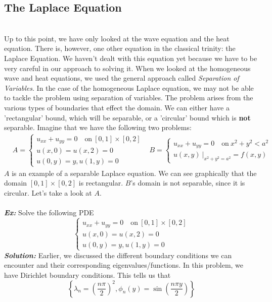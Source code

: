 \subsection{The Laplace Equation}
\noindent \\
\indent Up to this point, we have only looked at the wave equation and the heat equation. There is, however, one other equation in the classical trinity: the Laplace Equation. We haven't dealt with this equation yet because we have to be very careful in our approach to solving it. When we looked at the homogeneous wave and heat equations, we used the general approach called \textit{Separation of Variables}. In the case of the homogeneous Laplace equation, we may not be able to tackle the problem using separation of variables. The problem arises from the various types of boundaries that effect the domain. We can either have a 'rectangular' bound, which will be separable, or a 'circular' bound which is \textbf{not} separable. Imagine that we have the following two problems:
\begin{align*}
&A =\begin{cases}
u_{xx} + u_{yy} = 0\quad \text{on}\ [0,1]\times[0,2]\\
u(x,0) = u(x,2) = 0\\
u(0,y) = y, u(1,y) = 0
\end{cases}
&B =\begin{cases}
u_{xx} + u_{yy} = 0\quad \text{on}\ x^{2} + y^{2} < a^{2}\\
u(x,y)\ \big |_{x^{2} + y^{2} = a^{2}} = f(x,y)
\end{cases}
\end{align*}
$A$ is an example of a separable Laplace equation. We can see graphically that the domain $[0,1] \times [0,2]$ is rectangular. $B$'s domain is not separable, since it is circular. Let's take a look at $A$.\\\\
\noindent \textbf{\textit{Ex:}} Solve the following PDE
\[
\begin{cases*}
u_{xx} + u_{yy} = 0\quad \text{on}\ [0,1]\times[0,2]\\
u(x,0) = u(x,2) = 0\\
u(0,y) = y, u(1,y) = 0
\end{cases*}
\]
\indent \textbf{\textit{Solution:}} Earlier, we discussed the different boundary conditions we can encounter and their corresponding eigenvalues/functions. In this problem, we have Dirichlet boundary conditions. This tells us that
\[
\left\{\lambda_{n} = \left(\frac{n\pi}{2}\right)^{2}, \phi_{n}(y) = \sin{\left(\frac{n\pi y}{2}\right)}\right\}
\]
